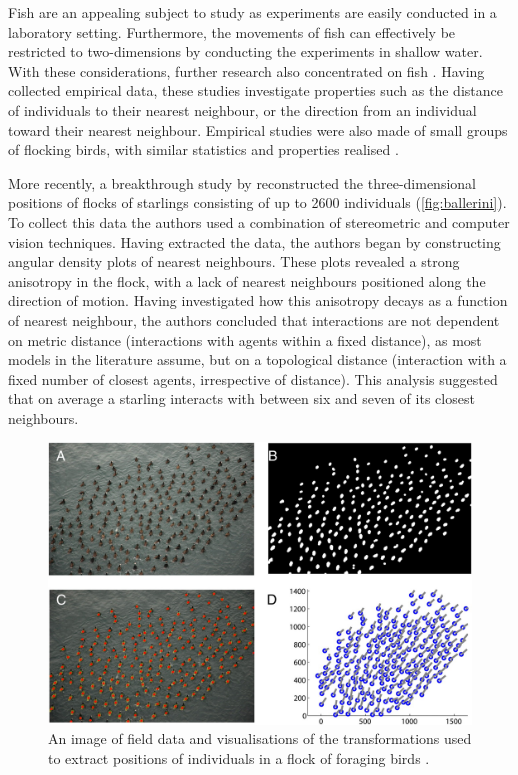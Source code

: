 Fish are an appealing subject to study as experiments are easily conducted in a
laboratory setting. Furthermore, the movements of fish can effectively be
restricted to two-dimensions by conducting the experiments in shallow water.
With these considerations, further research also concentrated on fish
\parencite{partridge80,van_long85}. Having collected empirical data, these
studies investigate properties such as the distance of individuals to their
nearest neighbour, or the direction from an individual toward their nearest
neighbour. Empirical studies were also made of small groups of flocking birds,
with similar statistics and properties realised \parencite{major78,budgey98}.

More recently, a breakthrough study by \textcite{ballerini08} reconstructed the
three-dimensional positions of flocks of starlings consisting of up to 2600
individuals (\cref{fig:ballerini}). To collect this data the authors
used a combination of stereometric and computer vision techniques. Having
extracted the data, the authors began by constructing angular
density plots of nearest neighbours. These plots revealed a strong anisotropy
in the flock, with a lack of nearest neighbours positioned along the direction
of motion. Having investigated how this anisotropy decays as a function of
nearest neighbour, the authors concluded that interactions are not dependent on
metric distance (interactions with agents within a fixed distance), as most
models in the literature assume, but on a topological distance (interaction
with a fixed number of closest agents, irrespective of distance). This analysis
suggested that on average a starling interacts with between six and seven of
its closest neighbours.

\begin{figure}[tb]
  \includegraphics[width=\textwidth]{lukeman_data.jpg}
  \caption{An image of field data and visualisations of the transformations
    used to extract positions of individuals in a flock of foraging birds 
    \parencite{lukeman10}.}
  \label{fig:lukeman_extraction}
\end{figure}

